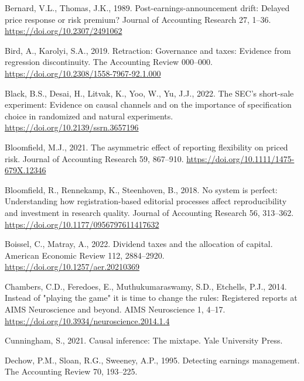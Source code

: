 \documentclass[
  letterpaper,
  DIV=11,
  numbers=noendperiod]{scrartcl}
\newlength{\cslhangindent}
\newlength{\cslentryspacingunit} %
\newenvironment{CSLReferences}[2] %
 {%
  \setlength{\parindent}{0pt}
  \ifodd #1
  \let\oldpar\par
  \def\par{\hangindent=\cslhangindent\oldpar}
  \fi
  \setlength{\parskip}{#2\cslentryspacingunit}
 }%
 {}
\begin{document}
\begin{CSLReferences}{1}{0}
\leavevmode{}%
Bernard, V.L., Thomas, J.K., 1989. Post-earnings-announcement drift:
Delayed price response or risk premium? Journal of Accounting Research
27, 1--36. \url{https://doi.org/10.2307/2491062}

\leavevmode{}%
Bird, A., Karolyi, S.A., 2019. Retraction: Governance and taxes:
Evidence from regression discontinuity. The Accounting Review 000--000.
\url{https://doi.org/10.2308/1558-7967-92.1.000}

\leavevmode{}%
Black, B.S., Desai, H., Litvak, K., Yoo, W., Yu, J.J., 2022. The {SEC}'s
short-sale experiment: Evidence on causal channels and on the importance
of specification choice in randomized and natural experiments.
\url{https://doi.org/10.2139/ssrn.3657196}

\leavevmode{}%
Bloomfield, M.J., 2021. The asymmetric effect of reporting flexibility
on priced risk. Journal of Accounting Research 59, 867--910.
\url{https://doi.org/10.1111/1475-679X.12346}

\leavevmode{}%
Bloomfield, R., Rennekamp, K., Steenhoven, B., 2018. No system is
perfect: Understanding how registration-based editorial processes affect
reproducibility and investment in research quality. Journal of
Accounting Research 56, 313--362.
\url{https://doi.org/10.1177/0956797611417632}

\leavevmode{}%
Boissel, C., Matray, A., 2022. Dividend taxes and the allocation of
capital. American Economic Review 112, 2884--2920.
\url{https://doi.org/10.1257/aer.20210369}

\leavevmode{}%
Chambers, C.D., Feredoes, E., Muthukumaraswamy, S.D., Etchells, P.J.,
2014. Instead of "playing the game" it is time to change the rules:
Registered reports at {AIMS Neuroscience} and beyond. {AIMS
Neuroscience} 1, 4--17.
\url{https://doi.org/10.3934/neuroscience.2014.1.4}

\leavevmode{}%
Cunningham, S., 2021. Causal inference: The mixtape. Yale University
Press.

\leavevmode{}%
Dechow, P.M., Sloan, R.G., Sweeney, A.P., 1995. Detecting earnings
management. The Accounting Review 70, 193--225.


\end{CSLReferences}
\end{document}
